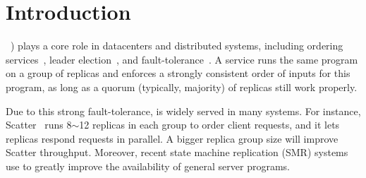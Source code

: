 \section{Introduction} \label{sec:intro}


\paxos~\cite{paxos:practical,paxos,paxos:simple,paxos:complex}) plays a core 
role in datacenters and distributed systems, including ordering 
services~\cite{ellis:thesis,manos:hotdep10,scatter:sosp11}, 
leader election~\cite{zookeeper, chubby:osdi}, and 
fault-tolerance~\cite{eve:osdi12,rex:eurosys14,crane:sosp15}. A \paxos service 
runs the same program on a group of replicas and enforces a strongly 
consistent order of inputs for this program, as long as a quorum (typically, 
majority) of replicas still work properly.

Due to this strong fault-tolerance, \paxos is widely served in many systems. 
For instance, Scatter~\cite{scatter:sosp11} runs 8$\sim$12 replicas in each 
\paxos group to order client requests, and it lets replicas respond requests 
in parallel. A bigger replica group size will improve Scatter throughput. 
Moreover, recent state machine replication (SMR) systems~\cite{ crane:sosp15, 
eve:osdi12, rex:eurosys14} use \paxos to greatly improve the availability of 
general server programs.






